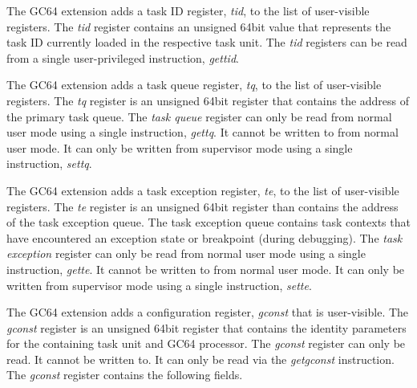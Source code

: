 \documentclass{article}
\begin{document}
\begin{center}
\end{center}

The GC64 extension adds a task ID register, \emph{tid}, to the list of user-visible registers.  The \emph{tid} register contains an unsigned 64bit value that represents the task ID currently loaded in the respective task unit.  The \emph{tid} registers can be read from a single user-privileged instruction, \emph{gettid}.  

\begin{center}
\end{center}

The GC64 extension adds a task queue register, \emph{tq}, to the list of user-visible registers.  The \emph{tq} register is an unsigned 64bit register that contains the address of the primary task queue.  The \emph{task queue} register can only be read from normal user mode using a single instruction, \emph{gettq}.  It cannot be written to from normal user mode.  It can only be written from supervisor mode using a single instruction, \emph{settq}.  

\begin{center}
\end{center}

The GC64 extension adds a task exception register, \emph{te}, to the list of user-visible registers.  The \emph{te} register is an unsigned 64bit register than contains the address of the task exception queue.  The task exception queue contains task contexts that have encountered an exception state or breakpoint (during debugging).  The \emph{task exception} register can only be read from normal user mode using a single instruction, \emph{gette}.  It cannot be written to from normal user mode.  It can only be written from supervisor mode using a single instruction, \emph{sette}.  

\begin{center}
\end{center}

The GC64 extension adds a configuration register, \emph{gconst} that is user-visible.  The \emph{gconst} register is an unsigned 64bit register that contains the identity parameters for the containing task unit and GC64 processor.  The \emph{gconst} register can only be read.  It cannot be written to.  It can only be read via the \emph{getgconst} instruction.  The \emph{gconst} register contains the following fields.  
\end{document}
